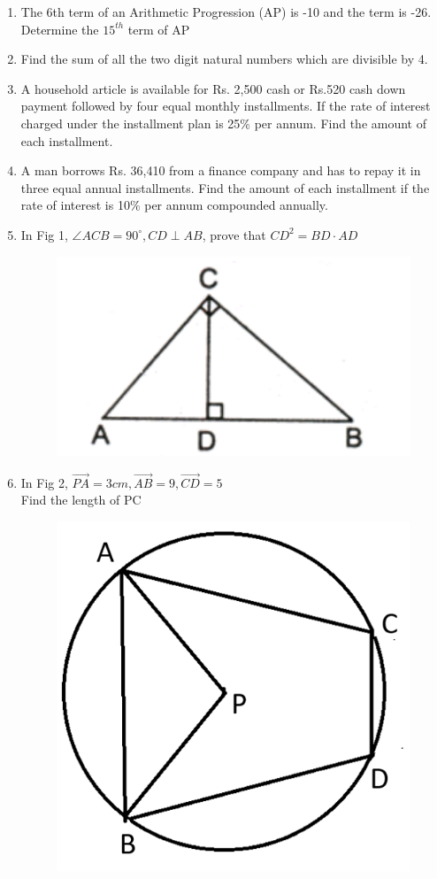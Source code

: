 \documentclass[journal,12pt,twocolumn]{IEEEtran}
\begin{document}
\begin{enumerate}[label=1.\arabic*]
\item The 6th term of an Arithmetic Progression (AP) is -10 and the term is -26. Determine the $15^{th}$ term of AP\\
\item Find the sum of all the two digit natural numbers which are divisible by 4.\\
\item A household article is available for Rs. 2,500 cash or Rs.520 cash down payment followed by four equal monthly installments.
If the rate of interest charged under the installment plan is 25\% per annum. Find the amount of each installment.\\
\item A man borrows Rs. 36,410 from a finance company and has to repay it in three equal annual installments. Find the amount of each
installment if the rate of interest is 10\% per annum compounded annually.\\
\item In Fig 1, $\angle{ACB} = 90^\circ , CD \perp AB $, prove that $CD^2 = BD \cdot AD $\\

\begin{figure}[h!]
\centering
\includegraphics[width=0.5\columnwidth,center,]{fig 1.1}\\
\caption{}
\label{fig1}
\end{figure}

\vspace{2mm}
\item In Fig 2, $\vec{PA} = 3cm, \vec{AB} = 9, \vec{CD} = 5$\\
Find the length of PC\\

\begin{figure}[width=0.5\columnwidth,center]
\centering
\includegraphics[width=0.5\columnwidth,center]{fig 1.2}\\
\caption{}
\label{Fig 2}
\end{figure}


\end{enumerate}
\end{document}
